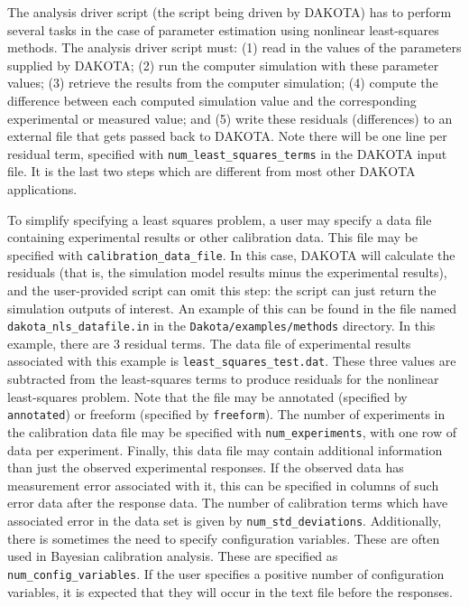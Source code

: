 The analysis driver script (the script being driven by DAKOTA) 
has to perform several tasks in the case of parameter estimation 
using nonlinear least-squares methods.  The analysis driver script 
must: (1) read in the values of the parameters supplied by DAKOTA;
(2) run the computer simulation with these parameter values;
(3) retrieve the results from the computer simulation;
(4) compute the difference between each computed simulation value
and the corresponding experimental or measured value; and 
(5) write these residuals (differences)
to an external file that gets passed back to DAKOTA.  Note there 
will be one line per residual term, specified with 
\texttt{num\_least\_squares\_terms}
in the DAKOTA input file.   It is the last two steps which are different from 
most other DAKOTA applications.  

To simplify specifying a least squares problem, a user may specify a
data file containing experimental results or other calibration data.
This file may be specified with \texttt{calibration\_data\_file}. 
In this case, DAKOTA will calculate the residuals (that is, the
simulation model results minus the experimental results), and the
user-provided script can omit this step: the script can just return
the simulation outputs of interest.  An example of this can be found
in the file named \texttt{dakota\_nls\_datafile.in} in the
\texttt{Dakota/examples/methods} directory.  In this example, there
are 3 residual terms.  The data file of experimental results
associated with this example is \texttt{least\_squares\_test.dat}.
These three values are subtracted from the least-squares terms to
produce residuals for the nonlinear least-squares problem.
Note that the file may be annotated (specified by \texttt{annotated}) or 
freeform (specified by \texttt{freeform}). The number of experiments in the 
calibration data file may be specified with \texttt{num\_experiments}, 
with one row of data per experiment.
Finally, this data file may contain additional information than just the observed 
experimental responses.  If the observed data has measurement error associated with it, 
this can be specified in columns of such error data after the response data. 
The number of calibration terms which have associated error in the data 
set is given by \texttt{num\_std\_deviations}.  Additionally, there is sometimes the 
need to specify configuration variables.  These are often used in Bayesian calibration 
analysis.  These are specified as \texttt{num\_config\_variables}.  If the user 
specifies a positive number of configuration variables, it is expected that they will 
occur in the text file before the responses. 

